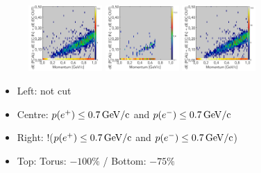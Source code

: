\documentclass[xcolor=table, xcolor=dvipsnames]{beamer}
\begin{document}
\begin{frame}
\begin{figure}
          \includegraphics[width=0.25\textwidth,origin=l]{triggerStudies_Tor075_CAL.png}
          \includegraphics[width=0.25\textwidth]{triggerStudies_Tor075_cut07_CAL_IN.png}
           \includegraphics[width=0.25\textwidth,origin=r]{triggerStudies_Tor075_cut07_CAL_OUT.png}  
        \end{figure}
        
        \begin{itemize}
          \item Left: not cut 
          \item Centre: $p(e^+) \le 0.7\,\rm{GeV/c}$ and $p(e^-) \le 0.7\,\rm{GeV/c}$ 
          \item  Right: !($p(e^+) \le 0.7\,\rm{GeV/c}$ and $p(e^-) \le 0.7\,\rm{GeV/c}$)
          \item Top: Torus: $-100\%$ / Bottom: $-75\%$
        \end{itemize}       
\end{frame}
\end{document}
